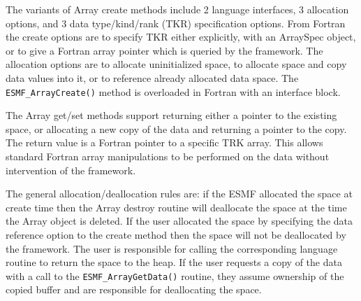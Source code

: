 

The variants of Array create methods include 2 language 
interfaces, 3 allocation options, and 3 data type/kind/rank (TKR) 
specification options.  
From Fortran the create options
are to specify TKR either explicitly, with an ArraySpec
object, or to give a Fortran array pointer which is queried by the
framework.  The allocation options are to allocate uninitialized
space, to allocate space and copy data values into it, or to
reference already allocated data space.
The {\tt ESMF\_ArrayCreate()} method is overloaded in Fortran with 
an interface block.

The Array get/set methods support returning either a pointer to
the existing space, or allocating a new copy of the data
and returning a pointer to the copy.  The return value is a Fortran 
pointer to a specific TRK array.  This allows standard Fortran array 
manipulations
to be performed on the data without intervention of the framework.

The general allocation/deallocation rules are: if the ESMF 
allocated the space at create time then the Array destroy routine 
will deallocate the space at the time the Array object is deleted.  
If the user allocated the space by specifying the data 
reference option to the create method then the space will not
be deallocated by the framework. The user is responsible
for calling the corresponding language routine to return the
space to the heap.  If the user requests a copy of the data with
a call to the {\tt ESMF\_ArrayGetData()} routine, they assume ownership of
the copied buffer and are responsible for deallocating the space.


